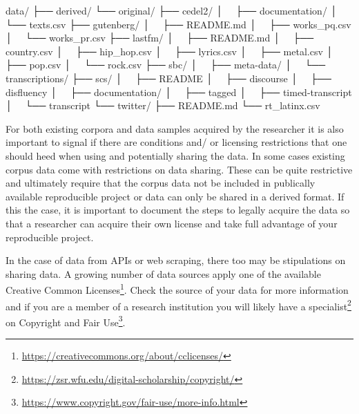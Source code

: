 \documentclass[
  letterpaper,
]{latex/krantz}
\newenvironment{Shaded}{\begin{snugshade}}{\end{snugshade}}
\newcommand{\ExtensionTok}[1]{\textcolor[rgb]{0.00,0.00,0.00}{#1}}
\newcommand{\NormalTok}[1]{\textcolor[rgb]{0.00,0.00,0.00}{#1}}
\DeclareRobustCommand{\href}[2]{#2\footnote{\url{#1}}}
\begin{document}
\begin{Shaded}
\begin{Highlighting}[]
\ExtensionTok{data/}
\ExtensionTok{├──}\NormalTok{ derived/}
\ExtensionTok{└──}\NormalTok{ original/}
    \ExtensionTok{├──}\NormalTok{ cedel2/}
    \ExtensionTok{│  }\NormalTok{ ├── documentation/}
    \ExtensionTok{│  }\NormalTok{ └── texts.csv}
    \ExtensionTok{├──}\NormalTok{ gutenberg/}
    \ExtensionTok{│  }\NormalTok{ ├── README.md}
    \ExtensionTok{│  }\NormalTok{ ├── works\_pq.csv}
    \ExtensionTok{│  }\NormalTok{ └── works\_pr.csv}
    \ExtensionTok{├──}\NormalTok{ lastfm/}
    \ExtensionTok{│  }\NormalTok{ ├── README.md}
    \ExtensionTok{│  }\NormalTok{ ├── country.csv}
    \ExtensionTok{│  }\NormalTok{ ├── hip\_hop.csv}
    \ExtensionTok{│  }\NormalTok{ ├── lyrics.csv}
    \ExtensionTok{│  }\NormalTok{ ├── metal.csv}
    \ExtensionTok{│  }\NormalTok{ ├── pop.csv}
    \ExtensionTok{│  }\NormalTok{ └── rock.csv}
    \ExtensionTok{├──}\NormalTok{ sbc/}
    \ExtensionTok{│  }\NormalTok{ ├── meta{-}data/}
    \ExtensionTok{│  }\NormalTok{ └── transcriptions/}
    \ExtensionTok{├──}\NormalTok{ scs/}
    \ExtensionTok{│  }\NormalTok{ ├── README}
    \ExtensionTok{│  }\NormalTok{ ├── discourse}
    \ExtensionTok{│  }\NormalTok{ ├── disfluency}
    \ExtensionTok{│  }\NormalTok{ ├── documentation/}
    \ExtensionTok{│  }\NormalTok{ ├── tagged}
    \ExtensionTok{│  }\NormalTok{ ├── timed{-}transcript}
    \ExtensionTok{│  }\NormalTok{ └── transcript}
    \ExtensionTok{└──}\NormalTok{ twitter/}
        \ExtensionTok{├──}\NormalTok{ README.md}
        \ExtensionTok{└──}\NormalTok{ rt\_latinx.csv}
\end{Highlighting}
\end{Shaded}

For both existing corpora and data samples acquired by the researcher it
is also important to signal if there are conditions and/ or licensing
restrictions that one should heed when using and potentially sharing the
data. In some cases existing corpus data come with restrictions on data
sharing. These can be quite restrictive and ultimately require that the
corpus data not be included in publically available reproducible project
or data can only be shared in a derived format. If this the case, it is
important to document the steps to legally acquire the data so that a
researcher can acquire their own license and take full advantage of your
reproducible project.

In the case of data from APIs or web scraping, there too may be
stipulations on sharing data. A growing number of data sources apply one
of \href{https://creativecommons.org/about/cclicenses/}{the available
Creative Common Licenses}. Check the source of your data for more
information and if you are a member of a research institution you will
likely have a
\href{https://zsr.wfu.edu/digital-scholarship/copyright/}{specialist} on
\href{https://www.copyright.gov/fair-use/more-info.html}{Copyright and
Fair Use}.
\end{document}
